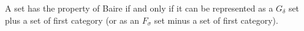 A set has the property of Baire if and only if it can be represented as a $G_\delta$ set plus a set of first category (or as an $F_\sigma$ set minus a set of first category).
